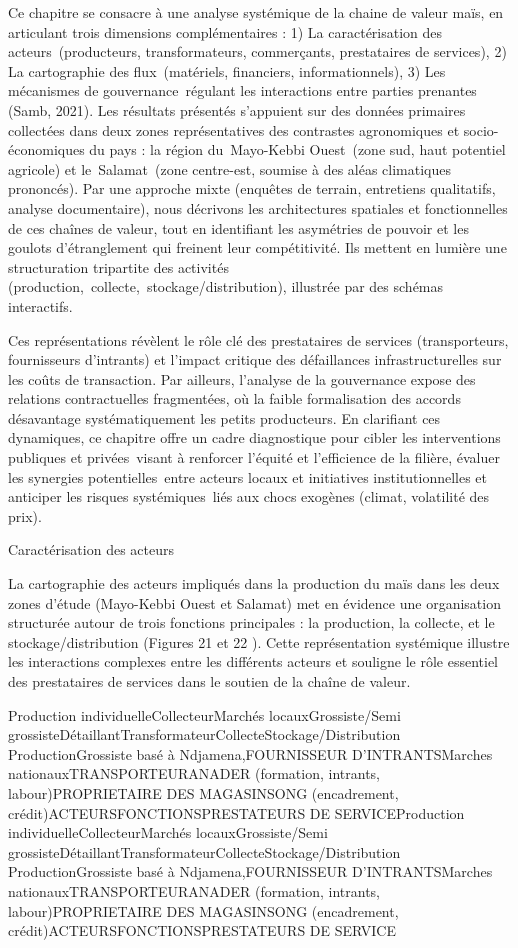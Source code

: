 \documentclass[12pt,oneside]{report}
\begin{document}
Ce chapitre se consacre à une analyse systémique de la chaine de valeur maïs, en articulant trois dimensions complémentaires : 1) La caractérisation des acteurs (producteurs, transformateurs, commerçants, prestataires de services), 2) La cartographie des flux (matériels, financiers, informationnels), 3) Les mécanismes de gouvernance régulant les interactions entre parties prenantes (Samb, 2021). Les résultats présentés s’appuient sur des données primaires collectées dans deux zones représentatives des contrastes agronomiques et socio-économiques du pays : la région du Mayo-Kebbi Ouest (zone sud, haut potentiel agricole) et le Salamat (zone centre-est, soumise à des aléas climatiques prononcés). Par une approche mixte (enquêtes de terrain, entretiens qualitatifs, analyse documentaire), nous décrivons les architectures spatiales et fonctionnelles de ces chaînes de valeur, tout en identifiant les asymétries de pouvoir et les goulots d’étranglement qui freinent leur compétitivité. Ils mettent en lumière une structuration tripartite des activités (production, collecte, stockage/distribution), illustrée par des schémas interactifs.

Ces représentations révèlent le rôle clé des prestataires de services (transporteurs, fournisseurs d’intrants) et l’impact critique des défaillances infrastructurelles sur les coûts de transaction. Par ailleurs, l’analyse de la gouvernance expose des relations contractuelles fragmentées, où la faible formalisation des accords désavantage systématiquement les petits producteurs. En clarifiant ces dynamiques, ce chapitre offre un cadre diagnostique pour cibler les interventions publiques et privées visant à renforcer l’équité et l’efficience de la filière, évaluer les synergies potentielles entre acteurs locaux et initiatives institutionnelles et anticiper les risques systémiques liés aux chocs exogènes (climat, volatilité des prix).

Caractérisation des acteurs

La cartographie des acteurs impliqués dans la production du maïs dans les deux zones d'étude (Mayo-Kebbi Ouest et Salamat) met en évidence une organisation structurée autour de trois fonctions principales : la production, la collecte, et le stockage/distribution (Figures 21 et 22 ). Cette représentation systémique illustre les interactions complexes entre les différents acteurs et souligne le rôle essentiel des prestataires de services dans le soutien de la chaîne de valeur.

Production individuelleCollecteurMarchés locauxGrossiste/Semi grossisteDétaillantTransformateurCollecteStockage/Distribution ProductionGrossiste basé à Ndjamena,FOURNISSEUR D’INTRANTSMarches nationauxTRANSPORTEURANADER (formation, intrants,  labour)PROPRIETAIRE DES MAGASINSONG (encadrement, crédit)ACTEURSFONCTIONSPRESTATEURS DE SERVICEProduction individuelleCollecteurMarchés locauxGrossiste/Semi grossisteDétaillantTransformateurCollecteStockage/Distribution ProductionGrossiste basé à Ndjamena,FOURNISSEUR D’INTRANTSMarches nationauxTRANSPORTEURANADER (formation, intrants,  labour)PROPRIETAIRE DES MAGASINSONG (encadrement, crédit)ACTEURSFONCTIONSPRESTATEURS DE SERVICE
\end{document}
